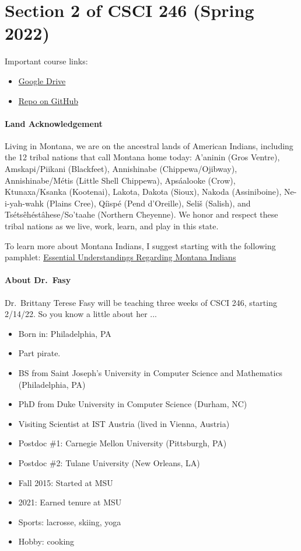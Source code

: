 \section*{Section 2 of CSCI 246 (Spring 2022)}

Important course links:
\begin{itemize}
    \item \href{https://drive.google.com/drive/folders/15M83uQne8Y-jddRmr5QYIur-tM_K77VQ?usp=sharing}{Google
    Drive}
    \item \href{https://github.com/msu/csci-246-spring2022}{Repo on GitHub}
\end{itemize}

\paragraph{Land Acknowledgement}

Living in Montana, we are on the ancestral lands of American Indians, including
the 12 tribal nations that call Montana home today: A’aninin (Gros Ventre),
Amskapi/Piikani (Blackfeet), Annishinabe (Chippewa/Ojibway), Annishinabe/Métis
(Little Shell Chippewa), Apsáalooke (Crow), Ktunaxa/Ksanka (Kootenai), Lakota,
Dakota (Sioux), Nakoda (Assiniboine), Ne-i-yah-wahk (Plains Cree), Qíispé (Pend
d’Oreille), Seliš (Salish), and Tsétsêhéstâhese/So’taahe (Northern Cheyenne).
We honor and respect these tribal nations as we live, work, learn, and play in
this state.

To learn more about Montana Indians, I suggest starting with the following
pamphlet:
\href{http://opi.mt.gov/Portals/182/Page%20Files/Indian%20Education/Indian%20Education%20101/essentialunderstandings.df}{Essential Understandings Regarding Montana Indians}


\paragraph{About Dr.~Fasy}
Dr.~Brittany Terese Fasy will be teaching three weeks of CSCI 246, starting
2/14/22.  So you know a little about her ...

\begin{itemize}
    \item Born in: Philadelphia, PA
    \item Part pirate.
    \item BS from Saint Joseph's University in Computer Science and Mathematics
        (Philadelphia, PA)
    \item PhD from Duke University in Computer Science (Durham, NC)
    \item Visiting Scientist at IST Austria (lived in Vienna, Austria)
    \item Postdoc \#1: Carnegie Mellon University (Pittsburgh, PA)
    \item Postdoc \#2: Tulane University (New Orleans, LA)
    \item Fall 2015: Started at MSU
    \item 2021: Earned tenure at MSU
    \item Sports: lacrosse, skiing, yoga
    \item Hobby: cooking
\end{itemize}
